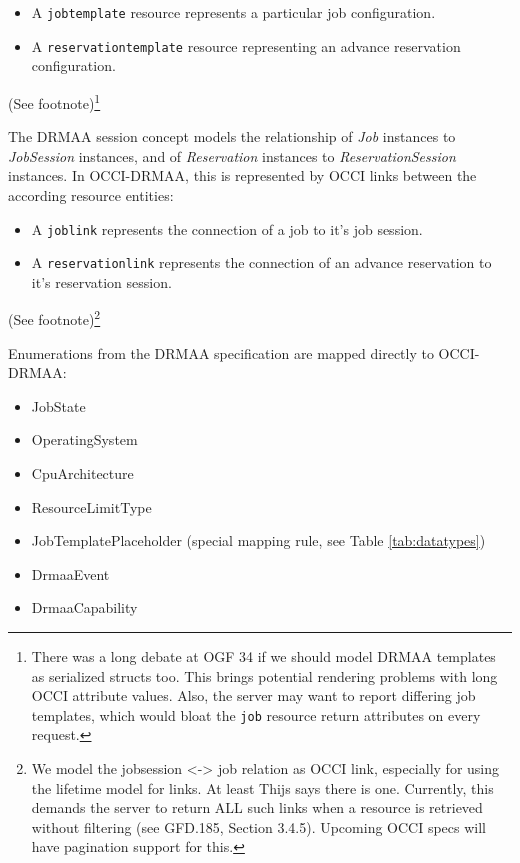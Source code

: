 \documentclass[10pt]{article}
\newcommand{\h}[1]{\lstinline|#1|}
\newcommand{\rat}[1]{ {\tiny(See footnote)}\footnote{#1} }
\begin{document}
\begin{itemize}
\item A \h{jobtemplate} resource represents a particular job configuration.
\item A \h{reservationtemplate} resource representing an advance reservation configuration.
\end{itemize}

\rat{There was a long debate at OGF 34 if we should model DRMAA templates as serialized structs too. This brings potential rendering problems with long OCCI attribute values. Also, the server may want to report differing job templates, which would bloat the \h{job} resource return attributes on every request.}

The DRMAA session concept models the relationship of \emph{Job} instances to \emph{JobSession} instances, and of \emph{Reservation} instances to \emph{ReservationSession} instances. In OCCI-DRMAA, this is represented by OCCI links between the according resource entities:

\begin{itemize}
\item A \h{joblink} represents the connection of a job to it's job session.
\item A \h{reservationlink} represents the connection of an advance reservation to it's reservation session.
\end{itemize}

\rat{We model the jobsession <-> job relation as OCCI link, especially for using the lifetime model for links. At least Thijs says there is one. Currently, this demands the server to return ALL such links when a resource is retrieved without filtering (see GFD.185, Section 3.4.5). Upcoming OCCI specs will have pagination support for this.}

Enumerations from the DRMAA specification are mapped directly to OCCI-DRMAA:

\begin{itemize}
\item JobState
\item OperatingSystem
\item CpuArchitecture
\item ResourceLimitType
\item JobTemplatePlaceholder (special mapping rule, see Table \ref{tab:datatypes})
\item DrmaaEvent
\item DrmaaCapability
\end{itemize}
\end{document}
